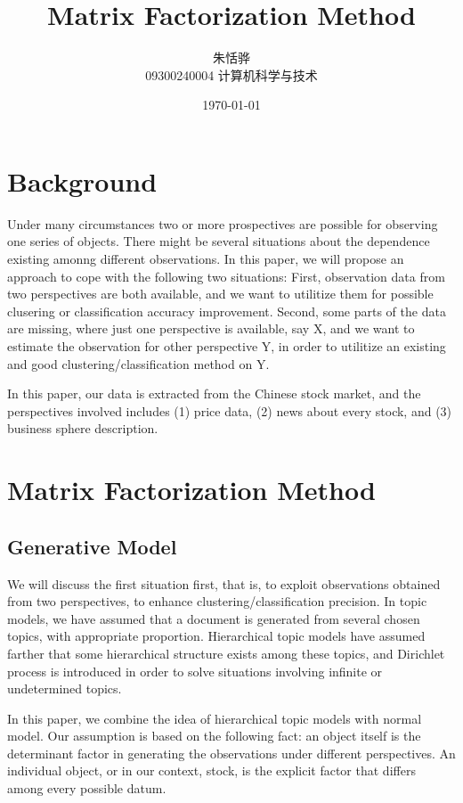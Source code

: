 \documentclass[12pt,a4paper]{article}
\begin{document}
\begin{CJK*}{UTF8}{song}

\title{Matrix Factorization Method}
\author{朱恬骅 \\
\small{09300240004 计算机科学与技术}}
\date{\today}
\maketitle

\section{Background}
Under many circumstances two or more prospectives are possible for observing one series of objects. There might be several situations about the dependence existing amonng different observations. In this paper, we will propose an approach to cope with the following two situations: First, observation data from two perspectives are both available, and we want to utilitize them for possible clusering or classification accuracy improvement. Second, some parts of the data are missing, where just one perspective is available, say X, and we want to estimate the observation for other perspective Y, in order to utilitize an existing and good clustering/classification method on Y.

In this paper, our data is extracted from the Chinese stock market, and the perspectives involved includes (1) price data, (2) news about every stock, and (3) business sphere description.

\section{Matrix Factorization Method}
\subsection{Generative Model}
We will discuss the first situation first, that is, to exploit observations obtained from two perspectives, to enhance clustering/classification precision. In topic models, we have assumed that a document is generated from several chosen topics, with appropriate proportion. Hierarchical topic models have assumed farther that some hierarchical structure exists among these topics, and Dirichlet process is introduced in order to solve situations involving infinite or undetermined topics.

In this paper, we combine the idea of hierarchical topic models with normal model. Our assumption is based on the following fact: an object itself is the determinant factor in generating the observations under different perspectives. An individual object, or in our context, stock, is the explicit factor that differs among every possible datum.


\end{CJK*}
\end{document}
